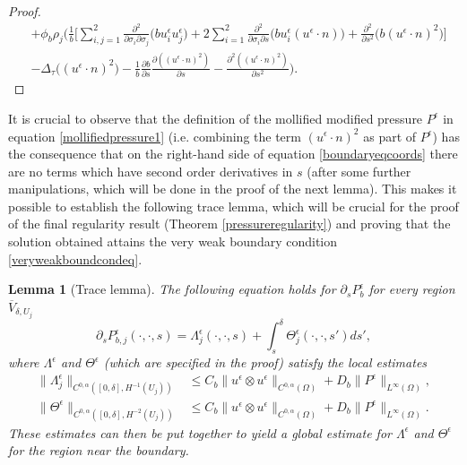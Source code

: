 \documentclass[12pt,a4paper]{article}
\newtheorem{lemma}[theorem]{Lemma}
\theoremstyle{definition}
\theoremstyle{remark}
\numberwithin{equation}{section}
\begin{document}
\begin{proof}
\begin{align*}
&+ \phi_b \rho_j \bigg( \frac{1}{b} \bigg[ \sum_{i,j=1}^2 \frac{\partial^2}{\partial \sigma_i \partial \sigma_j} \big( b u^\epsilon_i u^\epsilon_j \big) + 2 \sum_{i=1}^2 \frac{\partial^2}{\partial \sigma_i \partial s} \big( b u^\epsilon_i (u^\epsilon \cdot n) \big) + \frac{\partial^2}{\partial s^2} \big( b (u^\epsilon \cdot n)^2 \big) \bigg] \\
&- \Delta_\tau \big( (u^\epsilon \cdot n)^2 \big) - \frac{1}{b} \frac{\partial b}{\partial s} \frac{\partial ( (u^\epsilon \cdot n)^2)}{\partial s} - \frac{\partial^2 ((u^\epsilon \cdot n)^2)}{\partial s^2} \bigg).
\end{align*}
\end{proof}
It is crucial to observe that the definition of the mollified modified pressure $P^\epsilon$ in equation \eqref{mollifiedpressure1} (i.e. combining the term $(u^\epsilon \cdot n)^2$ as part of $P^\epsilon$) has the consequence that on the right-hand side of equation \eqref{boundaryeqcoords} there are no terms which have second order derivatives in $s$ (after some further manipulations, which will be done in the proof of the next lemma). This makes it possible to establish the following trace lemma, which will be crucial for the proof of the final regularity result (Theorem \ref{pressureregularity}) and proving that the solution obtained attains the very weak boundary condition \eqref{veryweakboundcondeq}. 
\begin{lemma}[Trace lemma] \label{tracelemma}
The following equation holds for $\partial_s P^\epsilon_b$ for every region $\overline{V}_{\delta, U_j}$
\begin{equation} \label{traceequation}
\partial_{s} P^\epsilon_{b,j} (\cdot, \cdot, s) = \Lambda^\epsilon_j ( \cdot, \cdot, s) + \int_{s}^\delta \Theta^\epsilon_j (\cdot, \cdot, s') d s',
\end{equation}
where $\Lambda^\epsilon$ and $\Theta^\epsilon$ (which are specified in the proof) satisfy the local estimates
\begingroup
\allowdisplaybreaks
\begin{align}
\lVert \Lambda^\epsilon_j \rVert_{C^{0, \alpha} ( [0, \delta], H^{-1} (U_j)) } &\leq C_b \lVert u^\epsilon \otimes u^\epsilon \rVert_{C^{0, \alpha} (\Omega)} + D_b \lVert P^\epsilon \rVert_{L^\infty (\Omega)}, \label{traceestimate1} \\
\lVert \Theta^\epsilon \rVert_{C^{0, \alpha} ([0, \delta], H^{-2} (U_j))} &\leq C_b \lVert u^\epsilon \otimes u^\epsilon \rVert_{C^{0, \alpha} (\Omega)} + D_b \lVert P^\epsilon \rVert_{L^\infty (\Omega)}. \label{traceestimate2}
\end{align}
\endgroup
These estimates can then be put together to yield a global estimate for $\Lambda^\epsilon$ and $\Theta^\epsilon$ for the region near the boundary.
\end{lemma}
\end{document}
